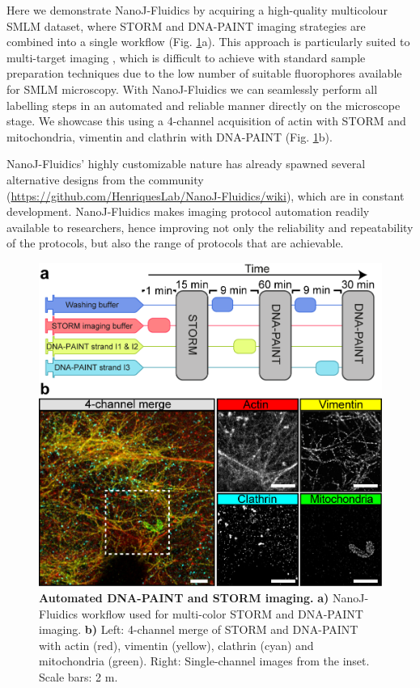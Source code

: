  Here we demonstrate NanoJ-Fluidics by acquiring a high-quality multicolour SMLM dataset, where STORM and DNA-PAINT \cite{jungmann2014multiplexed} imaging strategies are combined into a single workflow (Fig. \ref{fig:PAINT}a). This approach is particularly suited to multi-target imaging \cite{dempsey2011evaluation}, which is difficult to achieve with standard sample preparation techniques due to the low number of suitable fluorophores available for SMLM microscopy. With NanoJ-Fluidics we can seamlessly perform all labelling steps in an automated and reliable manner directly on the microscope stage. We showcase this using a 4-channel acquisition of actin with STORM and mitochondria, vimentin and clathrin with DNA-PAINT (Fig. \ref{fig:PAINT}b). 

 NanoJ-Fluidics' highly customizable nature has already spawned several alternative designs from the community (\href{https://github.com/HenriquesLab/NanoJ-Fluidics/wiki}{https://github.com/HenriquesLab/NanoJ-Fluidics/wiki}), which are in constant development. NanoJ-Fluidics makes imaging protocol automation readily available to researchers, hence improving not only the reliability and repeatability of the protocols, but also the range of protocols that are achievable.  

 \begin{figure}[!t]
    \centering
    \includegraphics{Figures/FigurePumpy_v4.png}
    \caption{\textbf{Automated DNA-PAINT and STORM imaging.} \textbf{a)} NanoJ-Fluidics workflow used for multi-color STORM and DNA-PAINT imaging. \textbf{b)} Left: 4-channel merge of STORM and DNA-PAINT with actin (red), vimentin (yellow), clathrin (cyan) and mitochondria (green). Right: Single-channel images from the inset. Scale bars: 2 \textmu{}m.}
    \label{fig:PAINT}
 \end{figure}

